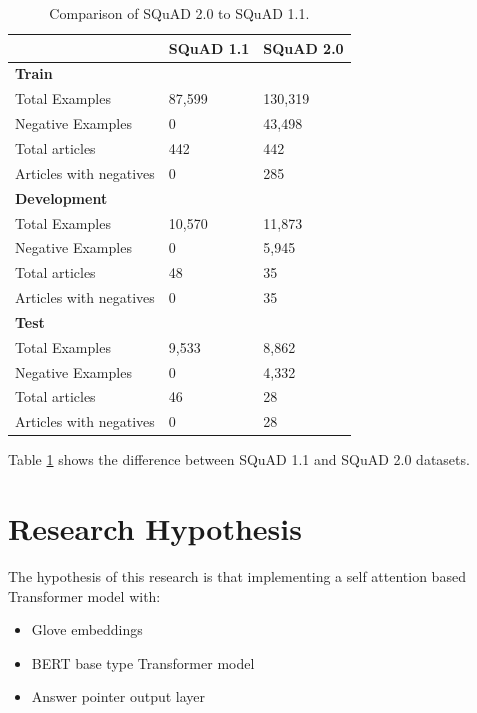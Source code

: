 \documentclass[a4paper,12pt]{report}
\begin{document}
		\begin{table}[h!]
		              \centering
		                \begin{tabular}{|l|l|l|}
		                    \hline
		                     & SQuAD 1.1 &  SQuAD 2.0 \\
		                    \hline
		                    \textbf{Train} & & \\
		                        Total Examples & 87,599 &  130,319 \\
		                        Negative Examples & 0 & 43,498 \\
		                        Total articles & 442 & 442 \\
		                        Articles with negatives & 0 & 285 \\
		                    \hline
		                    \textbf{Development} & & \\
		                        Total Examples & 10,570 &  11,873 \\
		                        Negative Examples & 0 & 5,945 \\
		                        Total articles & 48 & 35 \\
		                        Articles with negatives & 0 & 35 \\
		                    \hline
		                    \textbf{Test} &  & \\
		                        Total Examples & 9,533 & 8,862 \\
		                        Negative Examples & 0 & 4,332 \\
		                        Total articles & 46 & 28 \\
		                        Articles with negatives & 0 & 28 \\
		                    \hline
		                \end{tabular}
		                \caption{Comparison of  SQuAD 2.0 to SQuAD 1.1\citep{dataset}.}\label{datasetDescription}
		 \end{table}

    Table \ref{datasetDescription} shows the difference between SQuAD 1.1 and SQuAD 2.0 datasets.

    \section{Research Hypothesis}\label{c33}
    The hypothesis of this research is that implementing a self attention based Transformer model with:
    \begin{itemize}
    	\item Glove embeddings
    	\item BERT base \citep{bert} type Transformer model
    	\item Answer pointer output layer\citep{lstmPointer, lstmhu2016question}
    \end{itemize}
\end{document}
